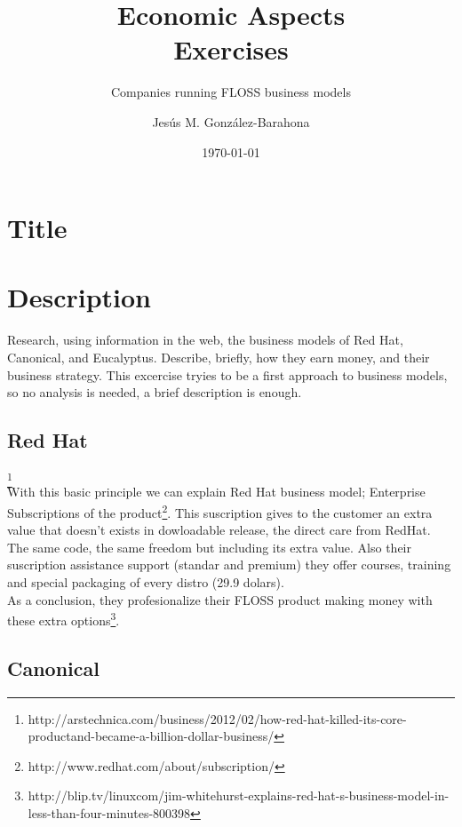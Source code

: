 \documentclass[11pt]{scrartcl}
\title{\textbf{Economic Aspects\\
                Exercises}}
\subtitle{Companies running FLOSS business models}
\author{Jesús M. González-Barahona}
\date{\today}
\begin{document}
\maketitle

\section{Title}

\section{Description}

Research, using information in the web, the business models of Red Hat, 
Canonical, and Eucalyptus. Describe, briefly, how they earn money, and their 
business strategy. This excercise tryies to be a first approach to business 
models, so no analysis is needed, a brief description is enough.

\subsection{Red Hat}

\footnote{http://arstechnica.com/business/2012/02/how-red-hat-killed-its-core-productand-became-a-billion-dollar-business/}\\
 
 With this basic principle we can explain Red Hat business model; Enterprise 
 Subscriptions of the product\footnote{http://www.redhat.com/about/subscription/}. 
 This suscription gives to the customer an extra value that doesn't exists
  in dowloadable release, the direct care from RedHat.\\
 The same code, the same freedom but including its extra value. Also their 
 suscription assistance support (standar and premium) they offer courses,
  training and special packaging of every distro (29.9 dolars).\\
 As a conclusion, they profesionalize their FLOSS product making money with 
 these extra options\footnote{http://blip.tv/linuxcom/jim-whitehurst-explains-red-hat-s-business-model-in-less-than-four-minutes-800398}.

\subsection{Canonical}
\end{document}
